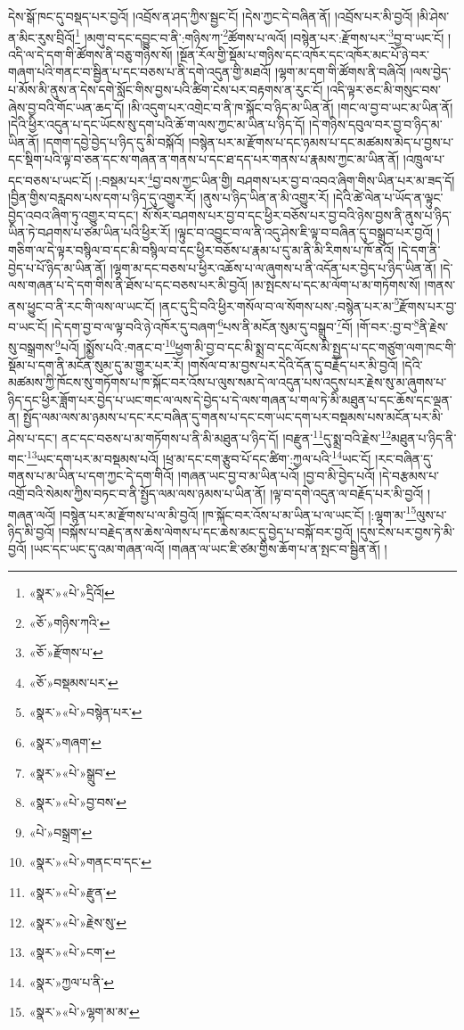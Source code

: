 དེས་སྒོ་ཁང་དུ་བསྡད་པར་བྱའོ། །འབྲོས་ན་ཤད་ཀྱིས་སྦྱང་ངོ། །དེས་ཀྱང་དེ་བཞིན་ནོ། །འབྲོས་པར་མི་བྱའོ། །མི་ཤེས་ན་མིང་རུས་བྲིའོ།\footnote{«སྣར་»«པེ་»དྲིའོ།} །མགུ་བ་དང་དབྱུང་བ་ནི་:གཉིས་ཀ་\footnote{«ཅོ་»གཉིས་ཀའི་}ཚོགས་པ་ལའོ། །བསྙེན་པར་:རྫོགས་པར་\footnote{«ཅོ་»རྫོགས་པ་}བྱ་བ་ཡང་ངོ། །འདི་ལ་དེ་དག་གི་ཚོགས་ནི་བཅུ་གཉིས་སོ། །སྔོན་རོལ་གྱི་སྡོམ་པ་གཉིས་དང་འཁོར་དང་འཁོར་མང་པོ་ཉེ་བར་གཞག་པའི་གནང་བ་སྦྱིན་པ་དང་བཅས་པ་ནི་དགེ་འདུན་གྱི་མཐའོ། །ལྷག་མ་དག་གི་ཚོགས་ནི་བཞིའོ། །ལས་བྱེད་པ་མོས་མི་ནུས་ན་དེས་དགེ་སློང་གིས་བྱས་པའི་ཚིག་ངེས་པར་བརྟགས་ན་རུང་ངོ། །འདི་ལྟར་ཅང་མི་གསུང་བས་ཞེས་བྱ་བའི་གོང་ཡན་ཆད་དོ། །མི་འདུག་པར་འགྲེང་བ་ནི་ཁ་སྐོང་བ་ཉིད་མ་ཡིན་ནོ། །གང་ལ་བྱ་བ་ཡང་མ་ཡིན་ནོ། །དེའི་ཕྱིར་འདུན་པ་དང་ཡོངས་སུ་དག་པའི་ཆོ་ག་ལས་ཀྱང་མ་ཡིན་པ་ཉིད་དོ། །དེ་གཉིས་དབུལ་བར་བྱ་བ་ཉིད་མ་ཡིན་ནོ། །དགག་དབྱེ་བྱེད་པ་ཉིད་དུ་མི་བསྐོའོ། །བསྙེན་པར་མ་རྫོགས་པ་དང་ཉམས་པ་དང་མཚམས་མེད་པ་བྱས་པ་དང་སྡིག་པའི་ལྟ་བ་ཅན་དང་ས་གཞན་ན་གནས་པ་དང་ཐ་དད་པར་གནས་པ་རྣམས་ཀྱང་མ་ཡིན་ནོ། །འཁྲུལ་པ་དང་བཅས་པ་ཡང་ངོ། །:བསྡམ་པར་\footnote{«ཅོ་»བསྡམས་པར་}བྱ་བས་ཀྱང་ཡིན་གྱི། བཤགས་པར་བྱ་བ་འབའ་ཞིག་གིས་ཡིན་པར་མ་ཟད་དོ། །བྱིན་གྱིས་བརླབས་པས་དག་པ་ཉིད་དུ་འགྱུར་རོ། །ནུས་པ་ཉིད་ཡིན་ན་མི་འགྱུར་རོ། །དེའི་ཚེ་ལེན་པ་ཡོད་ན་ལྟུང་བྱེད་འབའ་ཞིག་ཏུ་འགྱུར་བ་དང་། སོ་སོར་བཤགས་པར་བྱ་བ་དང་ཕྱིར་བཅོས་པར་བྱ་བའི་ཉེས་བྱས་ནི་ནུས་པ་ཉིད་ཡིན་ཏེ་བཤགས་པ་ཙམ་ཡིན་པའི་ཕྱིར་རོ། །ལྟུང་བ་འབྱུང་བ་ལ་ནི་འདུ་ཤེས་ཇི་ལྟ་བ་བཞིན་དུ་བསྒྲུབ་པར་བྱའོ། །གཅིག་ལ་དེ་ལྟར་བསྙིལ་བ་དང་མི་བསྙིལ་བ་དང་ཕྱིར་བཅོས་པ་རྣམ་པ་དུ་མ་ནི་མི་རིགས་པ་ཁོ་ནའོ། །དེ་དག་ནི་བྱེད་པ་པོ་ཉིད་མ་ཡིན་ནོ། །ལྷག་མ་དང་བཅས་པ་ཕྱིར་འཆོས་པ་ལ་ཞུགས་པ་ནི་འདོན་པར་བྱེད་པ་ཉིད་ཡིན་ནོ། །དེ་ལས་གཞན་པ་དེ་དག་གིས་ནི་ཐོས་པ་དང་བཅས་པར་མི་བྱའོ། །མ་སྤངས་པ་དང་མ་ལོག་པ་མ་གཏོགས་སོ། །གནས་ནས་ཕྱུང་བ་ནི་རང་གི་ལས་ལ་ཡང་ངོ། །ནང་དུ་དྲི་བའི་ཕྱིར་གསོལ་བ་ལ་སོགས་པས་:བསྙེན་པར་མ་\footnote{«སྣར་»«པེ་»བསྙེན་པར་}རྫོགས་པར་བྱ་བ་ཡང་ངོ། །དེ་དག་བྱ་བ་ལ་ལྟ་བའི་ཉེ་འཁོར་དུ་བཞག་\footnote{«སྣར་»གཞག་}པས་ནི་མངོན་སུམ་དུ་བསྒྲུབ་\footnote{«སྣར་»«པེ་»སྒྲུབ་}བོ། །གོ་བར་:བྱ་བ་\footnote{«སྣར་»«པེ་»བྱ་བས་}ནི་རྗེས་སུ་བསྒྲགས་\footnote{«པེ་»བསྒྲག་}པའོ། །སྨྱོས་པའི་:གནང་བ་\footnote{«སྣར་»«པེ་»གནང་བ་དང་}ཕྱག་མི་བྱ་བ་དང་མི་སྨྲ་བ་དང་ལོངས་མི་སྤྱད་པ་དང་གཙུག་ལག་ཁང་གི་སྡོམ་པ་དག་ནི་མངོན་སུམ་དུ་མ་གྱུར་པར་རོ། །གསོལ་བ་མ་བྱས་པར་དེའི་དོན་དུ་བརྗོད་པར་མི་བྱའོ། །དེའི་མཚམས་ཀྱི་ཁོངས་སུ་གཏོགས་པ་ཁ་སྐོང་བར་འོས་པ་ལུས་སམ་དེ་ལ་འདུན་པས་འདུས་པར་རྗེས་སུ་མ་ཞུགས་པ་ཉིད་དང་ཕྱིར་ཟློག་པར་བྱེད་པ་ཡང་གང་ལ་ལས་དེ་བྱེད་པ་དེ་ལས་གཞན་པ་གལ་ཏེ་མི་མཐུན་པ་དང་ཆོས་དང་ལྡན་ན། སྤྱོད་ལམ་ལས་མ་ཉམས་པ་དང་རང་བཞིན་དུ་གནས་པ་དང་ངག་ཡང་དག་པར་བསྡམས་པས་མངོན་པར་མི་ཤེས་པ་དང་། ནང་དང་བཅས་པ་མ་གཏོགས་པ་ནི་མི་མཐུན་པ་ཉིད་དོ། །བརྫུན་\footnote{«སྣར་»«པེ་»རྫུན་}དུ་སྨྲ་བའི་རྗེས་\footnote{«སྣར་»«པེ་»རྗེས་སུ་}མཐུན་པ་ཉིད་ནི་གང་\footnote{«སྣར་»«པེ་»ངག་}ཡང་དག་པར་མ་བསྡམས་པའོ། །ཕྲ་མ་དང་ངག་རྩུབ་པོ་དང་ཚིག་:ཀྱལ་པའི་\footnote{«སྣར་»ཀྱལ་པ་ནི་}ཡང་ངོ། །རང་བཞིན་དུ་གནས་པ་མ་ཡིན་པ་དག་ཀྱང་དེ་དག་གིའོ། །གཞན་ཡང་བྱ་བ་མ་ཡིན་པའོ། །བྱ་བ་མི་བྱེད་པའོ། །དེ་བརྩམས་པ་འགྲོ་བའི་སེམས་ཀྱིས་བཏང་བ་ནི་སྤྱོད་ལམ་ལས་ཉམས་པ་ཡིན་ནོ། །ལྟ་བ་དགེ་འདུན་ལ་བརྗོད་པར་མི་བྱའོ། །གཞན་ལའོ། །བསྙེན་པར་མ་རྫོགས་པ་ལ་མི་བྱའོ། །ཁ་སྐོང་བར་འོས་པ་མ་ཡིན་པ་ལ་ཡང་ངོ། །:ལྷག་མ་\footnote{«སྣར་»«པེ་»ལྷག་མ་མ་}ལུས་པ་ཉིད་མི་བྱའོ། །བསྐོས་པ་བརྗེད་ནས་ཆེས་ལེགས་པ་དང་ཆེས་མང་དུ་བྱེད་པ་བསྐོ་བར་བྱའོ། །དུས་ངེས་པར་བྱས་ཏེ་མི་བྱའོ། །ཡང་དང་ཡང་དུ་འམ་གཞན་ལའོ། །གཞན་ལ་ཡང་ཇི་ཙམ་གྱིས་ཆོག་པ་ན་སྤང་བ་སྦྱིན་ནོ། །
